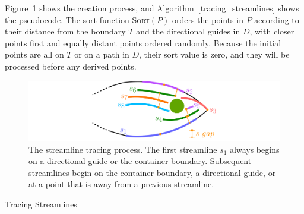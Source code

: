 Figure~\ref{streamline_tracing} shows the creation process, and 
Algorithm~\ref{tracing_streamlines} shows the pseudocode.
The sort function \textsc{Sort}$(P)$ orders the points in $P$ according to their distance from the
boundary $T$ and the directional guides in $D$, with closer points first and equally distant
points ordered randomly. Because the initial points are all on $T$ or on a path in $D$, their
sort value is zero, and they will be processed before any derived points. 

\begin{figure}
\centering
\includegraphics[width=1.0\textwidth]{figures/flowpak/streamline_tracing.pdf}
\caption[The streamline tracing process]
{\label{streamline_tracing}
The streamline tracing process. The first streamline $s_1$ always begins
on a directional guide or the container boundary.  Subsequent streamlines begin
on the container boundary, a directional guide, or at a point that is 
 away from a previous streamline.}
\end{figure}

\begin{algorithm}
\caption{Tracing Streamlines} 
\label{tracing_streamlines}
\end{algorithm}





